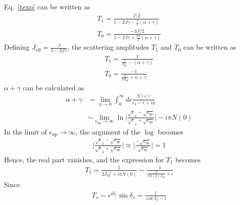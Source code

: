 \documentclass[twoside]{report}
\numberwithin{equation}{section}
\begin{document}
Eq.~\ref{texp} can be written as
\begin{gather}
	T_1 = \frac{J/2}{1 - 2 J \gamma - \frac{J}{2}\left(\alpha + \gamma\right)}\\
	T_0 = \frac{-3J/2}{1 - 2 J \gamma + \frac{3J}{2}\left(\alpha + \gamma\right)}
\end{gather}
Defining \(J_\text{eff} = \frac{J}{1 - 2J\gamma}\), the scattering amplitudes \(T_1\) and \(T_0\) can be written as
\begin{equation}\begin{aligned}
	T_1 = \frac{1}{\frac{2}{J_\text{eff}} - \left(\alpha + \gamma\right)}\\
T_0 = \frac{-1}{\frac{2}{3J_\text{eff}}+\alpha + \gamma}
\end{aligned}\end{equation}
\(\alpha + \gamma\) can be calculated as 
\begin{equation}\begin{aligned}
\alpha + \gamma &= \lim_{\eta \rightarrow 0}\int_0^\infty d\epsilon \frac{N(\epsilon)}{\epsilon_k - \epsilon+ i\eta} \\
        &\sim\lim_{\epsilon_\text{up} \rightarrow \infty} \ln \bigg\lvert \frac{\sqrt \epsilon_k - \sqrt{\epsilon_\text{up}}}{\sqrt \epsilon_k + \sqrt{\epsilon_\text{up}}}\bigg \rvert - i \pi N(0)
\end{aligned}\end{equation}
In the limit of \(\epsilon_\text{up} \rightarrow \infty\), the argument of the \(\log\) becomes
\begin{equation}\begin{aligned}
\bigg\lvert \frac{\sqrt \epsilon_k - \sqrt{\epsilon_\text{up}}}{\sqrt \epsilon_k + \sqrt{\epsilon_\text{up}}}\bigg \rvert \approx \bigg\lvert \frac{- \sqrt{\epsilon_\text{up}}}{\sqrt{\epsilon_\text{up}}}\bigg \rvert = 1
\end{aligned}\end{equation}
Hence, the real part vanishes, and the expression for \(T_1\) becomes
\begin{equation}\begin{aligned}
T_1 = \frac{1}{2J^{-1}_\text{eff} + i \pi N(0)} \sim \frac{1}{\frac{2}{\pi N(0)J_\text{eff}} + i}
\end{aligned}\end{equation}
Since
\begin{equation}\begin{aligned}
T_s \sim e^{i \delta_s} \sin \delta_s = \frac{1}{\cot \delta_s - i}
\end{aligned}\end{equation}
\end{document}
